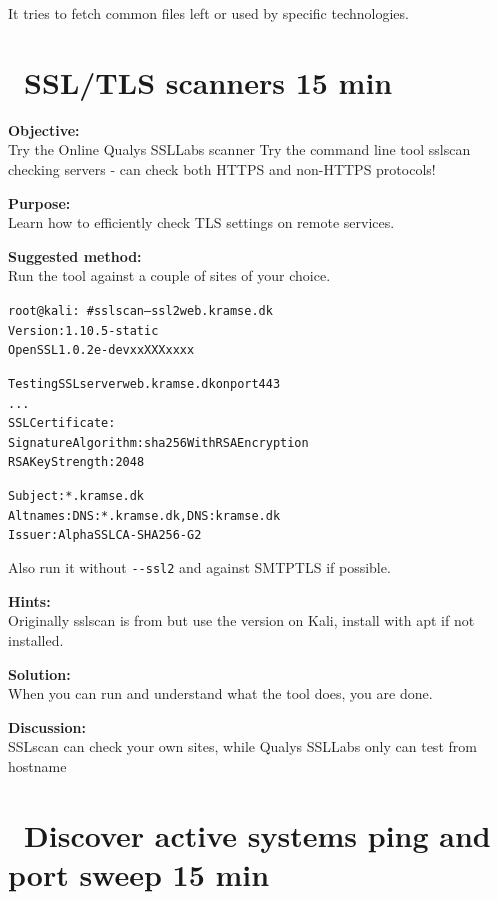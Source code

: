 \documentclass[a4paper,11pt,notitlepage]{report}
\begin{document}
It tries to fetch common files left or used by specific technologies.



\chapter{\faInfoCircle\ SSL/TLS scanners 15 min}
\label{ex:sslscan}

{\bf Objective:}\\
Try the Online Qualys SSLLabs scanner 
Try the command line tool sslscan checking servers - can check both HTTPS and non-HTTPS protocols!

{\bf Purpose:}\\
Learn how to efficiently check TLS settings on remote services.

{\bf Suggested method:}\\
Run the tool against a couple of sites of your choice.

\begin{alltt}\small
root@kali:~# sslscan --ssl2 web.kramse.dk
Version: 1.10.5-static
OpenSSL 1.0.2e-dev xx XXX xxxx

Testing SSL server web.kramse.dk on port 443
...
  SSL Certificate:
Signature Algorithm: sha256WithRSAEncryption
RSA Key Strength:    2048

Subject:  *.kramse.dk
Altnames: DNS:*.kramse.dk, DNS:kramse.dk
Issuer:   AlphaSSL CA - SHA256 - G2
\end{alltt}

Also run it without \verb+--ssl2+ and against SMTPTLS if possible.

{\bf Hints:}\\
Originally sslscan is from  but use the version on Kali, install with apt if not installed.

{\bf Solution:}\\
When you can run and understand what the tool does, you are done.

{\bf Discussion:}\\
SSLscan can check your own sites, while Qualys SSLLabs only can test from hostname


\chapter{\faExclamationTriangle\ Discover active systems ping and port sweep 15 min}
\label{ex:nmap-pingsweep}
\end{document}

